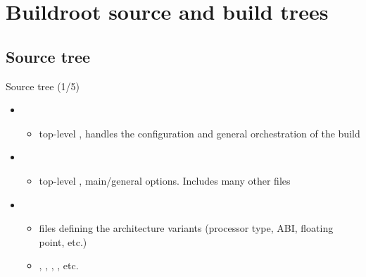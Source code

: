\section{Buildroot source and build trees}

\subsection{Source tree}

\begin{frame}{Source tree (1/5)}
  \begin{itemize}
  \item {}
    \begin{itemize}
    \item top-level , handles the configuration and
      general orchestration of the build
    \end{itemize}
  \item {}
    \begin{itemize}
    \item top-level , main/general options. Includes
      many other  files
    \end{itemize}
  \item {}
    \begin{itemize}
    \item {} files defining the architecture
      variants (processor type, ABI, floating point, etc.)
    \item {}, ,
      , , etc.
    \end{itemize}
  \end{itemize}
\end{frame}

